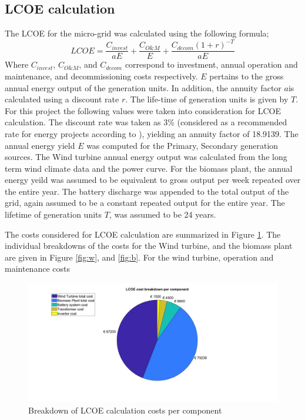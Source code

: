 \subsection{LCOE calculation}
\label{LCOE}
The LCOE for the micro-grid was calculated using the following formula;
\begin{equation}
    LCOE = \frac{C_{invest}}{aE} + \frac{C_{O\&M}}{E} + \frac{C_{decom}(1+r)^{-T}}{aE}
\end{equation}
Where $ C_{invest}$, $ C_{O\&M} $, and $ C_{decom} $ correspond to investment, annual operation and maintenance, and decommissioning costs respectively. $ E $ pertains to the gross annual energy output of the generation units. In addition, the annuity factor $ a $is calculated using a discount rate $ r $. The life-time of generation units is given by $ T $.
For this project the following values were taken into consideration for LCOE calculation. The discount rate was taken as 3\% (considered as a recommended rate for energy projects according to \citep{IEA2015}), yielding an annuity factor of 18.9139. The annual energy yield $ E $ was computed for the Primary, Secondary generation sources. The Wind turbine annual energy output was calculated from the long term wind climate data and the power curve. For the biomass plant, the annual energy yeild was assumed to be equivalent to gross output per week repeated over the entire year. The battery discharge was appended to the total output of the grid, again assumed to be a constant repeated output for the entire year. The lifetime of generation units $ T $, was assumed to be 24 years. 

\noindent The costs considered for LCOE calculation are summarized in Figure \ref{fig:lcoe}. The individual breakdowns of the costs for the Wind turbine, and the biomass plant are given in Figure \ref{fig:w}, and \ref{fig:b}. For the wind turbine, operation and maintenance costs 

\begin{figure}[H]
    \centering
    \includegraphics[width=1.1 \linewidth]{Final_report/Images/mgtotal.png}
    \caption{Breakdown of LCOE calculation costs per component}
    \label{fig:lcoe}
\end{figure}


